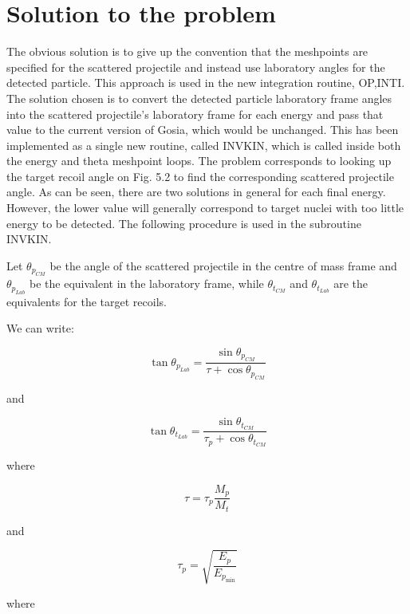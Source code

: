 \documentclass[10pt]{article}
\begin{document}
\section*{Solution to the problem}
The obvious solution is to give up the convention that the meshpoints are specified for the scattered projectile and instead use laboratory angles for the detected particle. This approach is used in the new integration routine, OP,INTI. The solution chosen is to convert the detected particle laboratory frame angles into the scattered projectile's laboratory frame for each energy and pass that value to the current version of Gosia, which would be unchanged. This has been implemented as a single new routine, called INVKIN, which is called inside both the energy and theta meshpoint loops. The problem corresponds to looking up the target recoil angle on Fig. 5.2 to find the corresponding scattered projectile angle. As can be seen, there are two solutions in general for each final energy. However, the lower value will generally correspond to target nuclei with too little energy to be detected. The following procedure is used in the subroutine INVKIN.

Let $\theta_{p_{C M}}$ be the angle of the scattered projectile in the centre of mass frame and $\theta_{p_{L a b}}$ be the equivalent in the laboratory frame, while $\theta_{t_{C M}}$ and $\theta_{t_{L a b}}$ are the equivalents for the target recoils.

We can write:


\begin{equation*}
\tan \theta_{p_{L a b}}=\frac{\sin \theta_{p_{C M}}}{\tau+\cos \theta_{p_{C M}}} \tag{6.46}
\end{equation*}


and


\begin{equation*}
\tan \theta_{t_{L a b}}=\frac{\sin \theta_{t_{C M}}}{\tau_{p}+\cos \theta_{t_{C M}}} \tag{6.47}
\end{equation*}


where


\begin{equation*}
\tau=\tau_{p} \frac{M_{p}}{M_{t}} \tag{6.48}
\end{equation*}


and


\begin{equation*}
\tau_{p}=\sqrt{\frac{E_{p}}{E_{p_{\min }}}} \tag{6.49}
\end{equation*}


where
\end{document}
